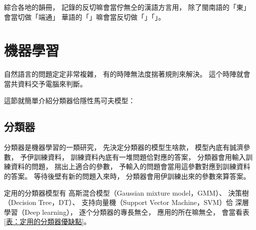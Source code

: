 綜合各地的韻冊，
記錄的反切嘛會當佇無仝的漢語方言用，
除了閩南語的「東」會當切做「端通」
華語的「」嘛會當反切做「」「」。








%

%


\section{機器學習}
\label{節：機器學習}
自然語言的問題定定非常複雜，
有的時陣無法度揣著規則來解決。
這个時陣就會當共資料交予電腦來判斷。

這節就簡單介紹分類器佮隱性馬可夫模型：

\subsection{分類器}
\label{小節：分類器}
分類器是機器學習的一類研究，
先決定分類器的模型生啥款，
模型內底有誠濟參數，
予伊訓練資料，
訓練資料內底有一堆問題佮對應的答案，
分類器會用輸入訓練資料的問題，
揣出上適合的參數， 
予輸入的問題會當用這參數對應到訓練資料的答案。
等待後壁有新的問題入來時，
分類器會用伊訓練出來的參數來算答案。

定用的分類器模型有
高斯混合模型（Gaussian mixture model，GMM）、
決策樹（Decision Tree，DT）、
支持向量機（Support Vector Machine，SVM）佮
深層學習（Deep learning），
逐个分類器的專長無仝，
應用的所在嘛無仝，
會當看表\ref{表：定用的分類器優缺點}。

